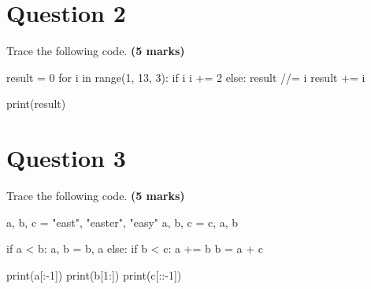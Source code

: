 \section{Question 2}
Trace the following code. \textbf{(5 marks)}
\begin{python}
result = 0
for i in range(1, 13, 3):
    if i %
        i += 2
    else:
        result //= i
    result += i

print(result)
\end{python}

\newpage

\section{Question 3}
Trace the following code. \textbf{(5 marks)}
\begin{python}
a, b, c = "east", "easter", "easy"
a, b, c = c, a, b

if a < b:
    a, b = b, a
else:
    if b < c:
        a += b
b = a + c

print(a[:-1])
print(b[1:])
print(c[::-1])
\end{python}

